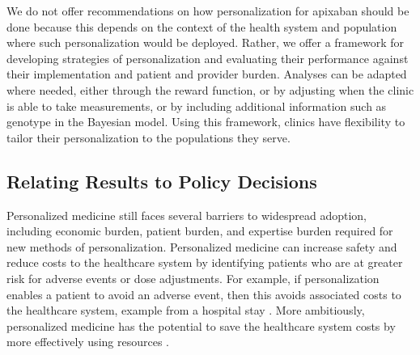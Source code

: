 
We do not offer recommendations on how personalization for apixaban should be done because this depends on the context of the health system and population where such personalization would be deployed. Rather, we offer a framework for developing strategies of personalization and evaluating their performance against their implementation and patient and provider burden.  Analyses can be adapted where needed, either through the reward function, or by adjusting when the clinic is able to take measurements, or by including additional information such as genotype in the Bayesian model.  Using this framework, clinics have flexibility to tailor their personalization to the populations they serve.

\subsection{Relating Results to Policy Decisions}

Personalized medicine still faces several barriers to widespread adoption, including economic burden, patient burden, and expertise burden required for new methods of personalization.
Personalized medicine can increase safety and reduce costs to the healthcare system by identifying patients who are at greater risk for adverse events or dose adjustments.  For example, if personalization enables a patient to avoid an adverse event, then this avoids associated costs to the healthcare system, example from a hospital stay \cite{looff2016economic}.  More ambitiously, personalized medicine has the potential to save the healthcare system costs by more effectively using resources \cite{shabaruddin2015economic}. 

